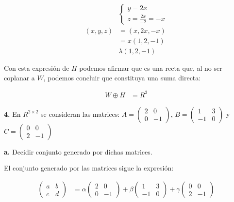 \documentclass[12pt]{article}
\begin{document}
\begin{align*}
          &
  \begin{cases}
    y = 2x \\
    z = \frac{2x}{-2} = -x
  \end{cases} \\
  (x,y,z) & = (x, 2x, -x) \\
  & = x(1,2,-1) \\
  &\boxed{\lambda(1,2,-1)}
\end{align*}

Con esta expresión de \(H\) podemos afirmar que es una recta que,
al no ser coplanar a \(W\),
podemos concluir que constituya una suma directa:

\begin{align*}
  W \oplus H & = R^{3}
\end{align*}

\textbf{4.}
En \(R^{2\times2}\) se consideran las matrices:
\(A = \begin{pmatrix}
  2&0\\0&-1
\end{pmatrix}\),
\(B = \begin{pmatrix}
  1&3\\-1&0
\end{pmatrix}\) y
\(C = \begin{pmatrix}
  0&0\\2&-1
\end{pmatrix}\)

\hspace{6mm}\textbf{a.}
Decidir conjunto generado por dichas matrices.

El conjunto generado por las matrices sigue la expresión:

\begin{align*}
  \begin{pmatrix}
    a&b\\c&d
  \end{pmatrix} & =
  \alpha
  \begin{pmatrix}
    2&0\\0&-1
  \end{pmatrix} +
  \beta
  \begin{pmatrix}
    1&3\\-1&0
  \end{pmatrix} +
  \gamma
  \begin{pmatrix}
    0&0\\2&-1
  \end{pmatrix}
\end{align*}
\end{document}
